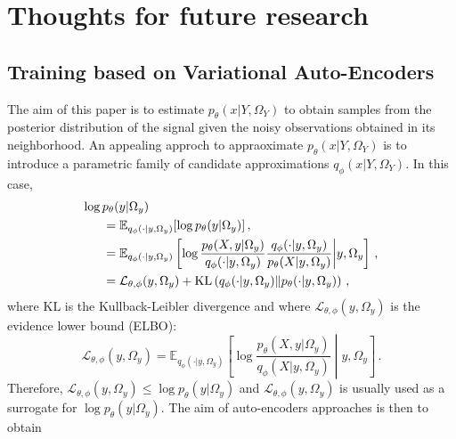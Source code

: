 
%


\clearpage
\newpage

\section{Thoughts for future research}
\subsection{Training based on Variational Auto-Encoders}
The aim of this paper is to estimate $p_{\theta}(x|Y,\Omega_Y)$ to obtain samples from the posterior distribution of the signal given the noisy observations obtained in its neighborhood. An appealing approch to appraoximate $p_{\theta}(x|Y,\Omega_Y)$  is to introduce a parametric family of candidate approximations $q_{\phi}(x|Y,\Omega_Y)$. In this case,
\begin{align*}
\log p_{\theta}(y|\Omega_y) &\\
&\hspace{-1.3cm}= \mathbb{E}_{q_{\phi}(\cdot|y,\Omega_y)}[\log p_{\theta}(y|\Omega_y)]\,,\\
&\hspace{-1.3cm}= \mathbb{E}_{q_{\phi}(\cdot|y,\Omega_y)}\left[\log \frac{p_\theta(X,y|\Omega_y)}{q_{\phi}(\cdot|y,\Omega_y)}\frac{q_{\phi}(\cdot|y,\Omega_y)}{p_\theta(X|y,\Omega_y)}\middle |y,\Omega_y\right]\,,\\
&\hspace{-1.3cm}= \mathcal{L}_{\theta,\phi}(y,\Omega_y) + \mathrm{KL}\left(q_{\phi}(\cdot|y,\Omega_y)\| p_\theta(\cdot|y,\Omega_y)\right)\,,
\end{align*}
where $ \mathrm{KL}$ is the Kullback-Leibler divergence and where $\mathcal{L}_{\theta,\phi}(y,\Omega_y)$ is the evidence lower bound (ELBO):
$$
 \mathcal{L}_{\theta,\phi}(y,\Omega_y)  = \mathbb{E}_{q_{\phi}(\cdot|y,\Omega_y)}\left[\log \frac{p_\theta(X,y|\Omega_y)}{q_{\phi}(X|y,\Omega_y)}\middle |y,\Omega_y\right]\,.
$$
Therefore, $ \mathcal{L}_{\theta,\phi}(y,\Omega_y) \leqslant \log p_{\theta}(y|\Omega_y)$ and $ \mathcal{L}_{\theta,\phi}(y,\Omega_y)$ is usually used as a surrogate for $ \log p_{\theta}(y|\Omega_y)$. The aim of auto-encoders approaches is then to obtain
